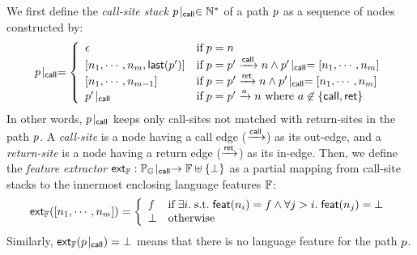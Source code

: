 We first define the \textit{call-site stack} ${p}\!\mid_{\textsf{call}} \in \mathbb{N}^*$ of a
path $p$ as a sequence of nodes constructed by:
\begin{equation}\label{equ:css}
  {p}\!\mid_{\textsf{call}} = \left\{
    \begin{array}{ll}
      \epsilon &
      \text{if} \; p = n\\

      {[n_1, \cdots, n_m, \textsf{last}(p')]} &
      \text{if} \; p = p' \xrightarrow{\textsf{call}} n \wedge
      {p'}\!\mid_{\textsf{call}} = [n_1, \cdots, n_m]\\

      {[n_1, \cdots, n_{m-1}]} &
      \text{if} \; p = p' \xrightarrow{\textsf{ret}} n \wedge
      {p'}\!\mid_{\textsf{call}} = [n_1, \cdots, n_m]\\

      {p'}\!\mid_{\textsf{call}} &
      \text{if} \; p = p' \xrightarrow{a} n\ \mbox{where } a
                    \not\in \{ \textsf{call}, \textsf{ret} \}

    \end{array}
  \right.
\end{equation}
In other words, ${p}\!\mid_{\textsf{call}}$ keeps only call-sites not matched with return-sites
in the path $p$.  A \textit{call-site} is a node having a call edge ($\xrightarrow{\textsf{call}}$)
as its out-edge, and a \textit{return-site} is a node having a return edge
($\xrightarrow{\textsf{ret}}$) as its in-edge.
%
Then, we define the \textit{feature extractor} $\textsf{ext}_{\mathbb{F}}: {\mathbb{P}_{\mathbb{G}}}\!\mid_{\textsf{call}}
\rightarrow \mathbb{F} \uplus \{ \bot \}$ as a partial mapping from call-site
stacks to the innermost enclosing language features $\mathbb{F}$:
\begin{equation}\label{equ:extfeat}
  \textsf{ext}_{\mathbb{F}}([n_1, \cdots, n_m]) = \left\{
    \begin{array}{ll}
      f & \text{if} \;
      \exists i. {\; \text{s.t.} \; } \textsf{feat}(n_i) = f \wedge
      \forall j > i. \; \textsf{feat}(n_j) = \bot
      \\

      \bot & \text{otherwise}
    \end{array}
  \right.
\end{equation}
%
Similarly, $\textsf{ext}_{\mathbb{F}}({p}\!\mid_{\textsf{call}}) = \bot$ means that there is no language feature
for the path $p$.


